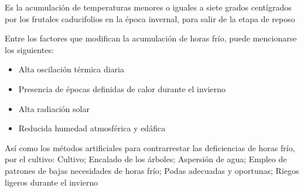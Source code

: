         \begin{definition}
            Es la acumulación de temperaturas menores o iguales a siete grados centígrados por los frutales caducifolios en la época invernal, para salir de la etapa de reposo
        \end{definition}
        Entre los factores que modifican la acumulación de horas frío, puede mencionarse los siguientes:
        \begin{itemize}
            \item Alta oscilación térmica diaria
            \item Presencia de épocas definidas de calor durante el invierno
            \item Alta radiación solar
            \item Reducida humedad atmosférica y edáfica
        \end{itemize}
        Así como los métodos artificiales para contrarrestar las deficiencias de horas frío, por el cultivo:  Cultivo; Encalado de los árboles; Aspersión de agua; Empleo de patrones de bajas necesidades de horas frío; Podas adecuadas y oportunas; Riegos ligeros durante el invierno
        
